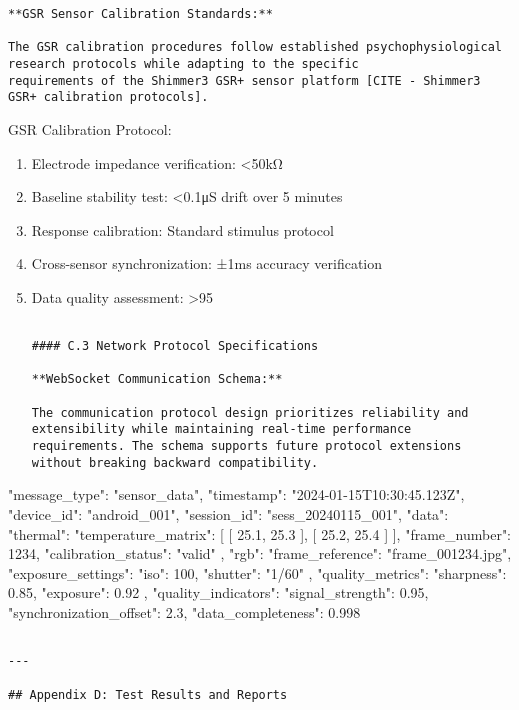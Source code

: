 \documentclass[12pt,a4paper]{report}
\begin{document}
{{\begin{itemize}
\begin{verbatim}
**GSR Sensor Calibration Standards:**

The GSR calibration procedures follow established psychophysiological research protocols while adapting to the specific
requirements of the Shimmer3 GSR+ sensor platform [CITE - Shimmer3 GSR+ calibration protocols].

\end{verbatim}
\end{itemize}
GSR Calibration Protocol:
\begin{enumerate}
\item Electrode impedance verification: <50kΩ
\item Baseline stability test: <0.1μS drift over 5 minutes
\item Response calibration: Standard stimulus protocol
\item Cross-sensor synchronization: ±1ms accuracy verification
\item Data quality assessment: >95%
\begin{verbatim}

#### C.3 Network Protocol Specifications

**WebSocket Communication Schema:**

The communication protocol design prioritizes reliability and extensibility while maintaining real-time performance
requirements. The schema supports future protocol extensions without breaking backward compatibility.

\end{verbatim}
\end{enumerate}
{
  "message\_type": "sensor\_data",
  "timestamp": "2024-01-15T10:30:45.123Z",
  "device\_id": "android\_001",
  "session\_id": "sess\_20240115\_001",
  "data": {
    "thermal": {
      "temperature\_matrix": [
        [
          25.1,
          25.3
        ],
        [
          25.2,
          25.4
        ]
      ],
      "frame\_number": 1234,
      "calibration\_status": "valid"
    },
    "rgb": {
      "frame\_reference": "frame\_001234.jpg",
      "exposure\_settings": {
        "iso": 100,
        "shutter": "1/60"
      },
      "quality\_metrics": {
        "sharpness": 0.85,
        "exposure": 0.92
      }
    }
  },
  "quality\_indicators": {
    "signal\_strength": 0.95,
    "synchronization\_offset": 2.3,
    "data\_completeness": 0.998
  }
}
\begin{verbatim}

---

## Appendix D: Test Results and Reports


\end{verbatim}}}
\end{document}
